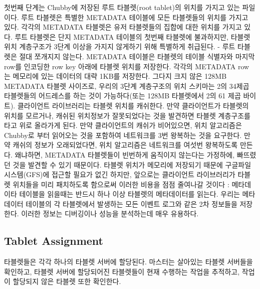 \documentclass[twocolumn]{article}
\begin{document}
 첫번째 단계는 Chubby에 저장된 루트 타블렛(root tablet)의 위치를 가지고 있는 파일이다. 루트 타블렛은 특별한 METADATA 테이블에 모든 타블렛들의 위치를 가지고 있다. 각각의 METADATA 타블렛은 유저 타블렛들의 집합에 대한 위치를 가지고 있다. 루트 타블렛은 단지 METADATA 테이블의 첫번째 타블렛에 불과하지만, 타블렛 위치 계층구조가 3단계 이상을 가지지 않게하기 위해 특별하게 취급된다. - 루트 타블렛은 절대 쪼개지지 않는다.
METADATA 테이블은 타블렛의 테이블 식별자와 마지막 row를 인코딩한 row key 아래에 타블렛 위치를 저장한다. 각각의 METADATA row 는 메모리에 있는 데이터의 대략 1KB를 저장한다. 그다지 크지 않은 128MB METADATA 타블렛 사이즈로, 우리의 3단계 계층구조의 위치 스키마는 2의 34제곱 타블렛들의 어드레스를 하는 것이 가능하다(또는 128MB 타블렛에서 2의 61 제곱 바이트).
클라이언트 라이브러리는 타블렛 위치를 캐쉬한다. 만약 클라이언트가 타블렛의 위치를 모르거나, 캐쉬된 위치정보가 잘못되었다는 것을 발견하면 타블렛 계층구조를 타고 위로 올라가게 된다. 만약 클라이언트의 캐쉬가 비어있으면, 위치 알고리즘은 Chubby로 부터 읽어오는 것을 포함하여 네트워크를 3번 왕복하는 것을 요구한다. 만약 캐쉬의 정보가 오래되었다면, 위치 알고리즘은 네트워크를 여섯번 왕복하도록 만든다. 왜냐하면, METADATA 타블렛들이 빈번하게 움직이지 않는다는 가정하에, 빠뜨렸던 것을 발견할 수 있기 때문이다.  타블렛 위치가 메모리에 저장되기 때문에 구글파일시스템(GFS)에 접근할 필요가 없긴 하지만, 앞으로는 클라이언트 라이브러리가 타블렛 위치들을 미리 패치하도록 함으로써 이러한 비용을 점점 줄여나갈 것이다 : 메타데이타 테이블을 읽을때는 반드시 하나 이상 타블렛의 메타데이터를 읽는다.
우리는 메타데이터 테이블의 각 타블렛에서 발생하는 모든 이벤트 로그와 같은 2차 정보들을 저장한다. 이러한 정보는 디버깅이나 성능을 분석하는데 매우 유용하다.
 
\subsection{Tablet Assignment}
타블렛들은 각각 하나의 타블렛 서버에 할당된다. 마스터는 살아있는 타블렛 서버들을 확인하고, 타블렛 서버에 할당되어진 타블렛들이 현재 수행하는 작업을 추적하고, 작업이 할당되지 않은 타블렛 또한 확인한다.
\end{document}

